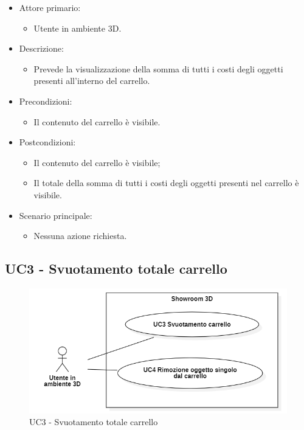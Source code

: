 \begin{itemize}
	
	\item Attore primario: 
	\begin{itemize}
		\item Utente in ambiente 3D.
	\end{itemize}
	\item Descrizione:
	\begin{itemize}
		\item Prevede la visualizzazione della somma di tutti i costi degli oggetti presenti all'interno del carrello.
	\end{itemize}
	
	\item Precondizioni:
	\begin{itemize}
		\item Il contenuto del carrello è visibile.
	\end{itemize}
	
	\item Postcondizioni:
	\begin{itemize}
		\item Il contenuto del carrello è visibile;
		\item Il totale della somma di tutti i costi degli oggetti presenti nel carrello è visibile.
	\end{itemize}
	
	\item Scenario principale:
	\begin{itemize}
		\item Nessuna azione richiesta.
	\end{itemize}
	
\end{itemize}


\pagebreak

\subsection{UC3 - Svuotamento totale carrello}

\begin{figure}[H]
  \renewcommand{\thefigure}{5}
  \includegraphics[width=\linewidth]{./res/images/UC3-4.png}
  \caption{UC3 - Svuotamento totale carrello}
  \label{fig:UC 3}
\end{figure}

